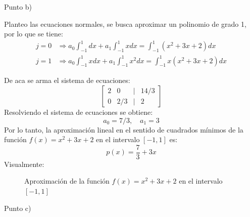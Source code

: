 \documentclass{article}
\begin{document}
\begin{center}
    Punto b) \\
\end{center}

Planteo las ecuaciones normales, se busca aproximar un polinomio de grado 1, por lo que se tiene:
\begin{align}
    j = 0 &\Rightarrow a_0 \int_{-1}^{1} dx + a_1 \int_{-1}^{1} x dx = \int_{-1}^{1} (x^2 + 3x + 2) dx \\
    j = 1 &\Rightarrow a_0 \int_{-1}^{1} x dx + a_1 \int_{-1}^{1} x^2 dx = \int_{-1}^{1} x(x^2 + 3x + 2) dx
\end{align}

De aca se arma el sistema de ecuaciones:
\begin{equation}
    \begin{bmatrix}
        2 & 0 & | & 14/3 \\
        0 & 2/3 & | & 2
    \end{bmatrix}
\end{equation}
Resolviendo el sistema de ecuaciones se obtiene:
\begin{equation}
    a_0 = 7/3, \quad a_1 = 3
\end{equation}
Por lo tanto, la aproximación lineal en el sentido de cuadrados mínimos de la función \( f(x) = x^2 + 3x + 2 \) en el intervalo \([-1,1]\) es:
\begin{equation}
    p(x) = \frac{7}{3} + 3x
\end{equation}
\newpage
Visualmente:
\begin{figure}[h]
    \centering
    \caption{Aproximación de la función \( f(x) = x^2 + 3x + 2 \) en el intervalo \([-1,1]\)}
    \label{fig:myplot10}
\end{figure}


\begin{center}
    Punto c) \\
\end{center}
\end{document}
